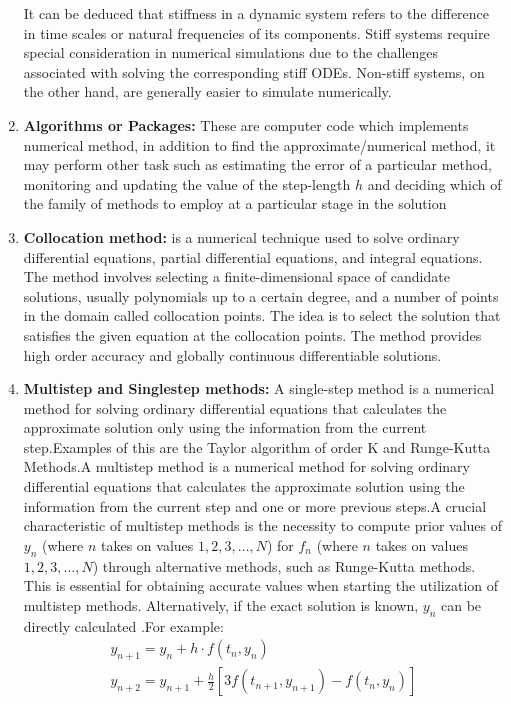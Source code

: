 \begin{enumerate}
  It can be deduced that stiffness in a dynamic system refers to the difference in time scales or natural frequencies of its components. Stiff systems require special consideration in numerical simulations due to the challenges associated with solving the corresponding stiff ODEs. Non-stiff systems, on the other hand, are generally easier to simulate numerically.

  \item \textbf{Algorithms or Packages:} These are computer code which implements numerical method, in addition to find the approximate/numerical method, it may perform other task such as estimating the error of a particular method, monitoring and updating the value of the step-length $h$ and deciding which of the family of methods to employ at a particular stage in the solution \cite{lambert1977} 

  \item \textbf{Collocation method:}  is a numerical technique used to solve ordinary differential equations, partial differential equations, and integral equations. The method involves selecting a finite-dimensional space of candidate solutions, usually polynomials up to a certain degree, and a number of points in the domain called collocation points. The idea is to select the solution that satisfies the given equation at the collocation points. The method provides high order accuracy and globally continuous differentiable solutions. \cite{enwiki:1166346639}
  
  \item \textbf{Multistep and Singlestep methods:} A single-step method is a numerical method for solving ordinary differential equations that calculates the approximate solution only using the information from the current step.Examples of this are the Taylor algorithm of order K and Runge-Kutta Methods.A multistep method is a numerical method for solving ordinary differential equations that calculates the approximate solution using the information from the current step and one or more previous steps.A crucial characteristic of multistep methods is the necessity to compute prior values of \(y_n\) (where \(n\) takes on values \(1, 2, 3, \ldots, N\)) for \(f_n\) (where \(n\) takes on values \(1, 2, 3, \ldots, N\)) through alternative methods, such as Runge-Kutta methods. This is essential for obtaining accurate values when starting the utilization of multistep methods. Alternatively, if the exact solution is known, \(y_n\) can be directly calculated \cite{powerseriesJFatokun}.For example:
  \begin{eqnarray}
   y_{n+1} = y_n + h \cdot f(t_n, y_n) \\
   y_{n+2} = y_{n+1} + \frac{h}{2} \left[ 3f(t_{n+1}, y_{n+1}) - f(t_n, y_n) \right]
  \end{eqnarray}


\end{enumerate}
